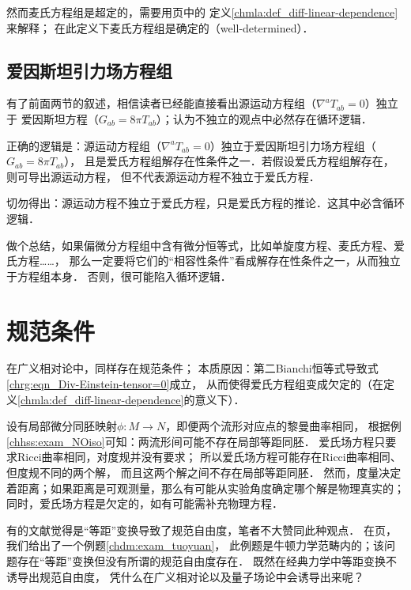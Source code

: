 然而麦氏方程组是超定的，需要用\pageref{chmla:def_diff-linear-dependence}页中的
定义\ref{chmla:def_diff-linear-dependence}来解释；
在此定义下麦氏方程组是确定的（well-determined）．

\subsection{爱因斯坦引力场方程组}
有了前面两节的叙述，相信读者已经能直接看出源运动方程组（$\nabla^a T_{ab}=0$）独立于
爱因斯坦方程（$G_{ab}=8\pi T_{ab}$）；认为不独立的观点中必然存在循环逻辑．

正确的逻辑是：源运动方程组（$\nabla^a T_{ab}=0$）独立于爱因斯坦引力场方程组（$G_{ab}=8\pi T_{ab}$），
且是爱氏方程组解存在性条件之一．若假设爱氏方程组解存在，则可导出源运动方程，
但不代表源运动方程不独立于爱氏方程．

切勿得出：源运动方程不独立于爱氏方程，只是爱氏方程的推论．这其中必含循环逻辑．

做个总结，如果偏微分方程组中含有微分恒等式，比如单旋度方程、麦氏方程、爱氏方程……，
那么一定要将它们的“相容性条件”看成解存在性条件之一，从而独立于方程组本身．
否则，很可能陷入循环逻辑．




\section{规范条件}
在广义相对论中，同样存在规范条件；
本质原因：第二Bianchi恒等式导致式\eqref{chrg:eqn_Div-Einstein-tensor=0}成立，
从而使得爱氏方程组变成欠定的（在定义\ref{chmla:def_diff-linear-dependence}的意义下）．

设有局部微分同胚映射$\phi:M\to N$，即便两个流形对应点的黎曼曲率相同，
根据例\ref{chhss:exam_NOiso}可知：两流形间可能不存在局部等距同胚．
爱氏场方程只要求Ricci曲率相同，对度规并没有要求；
所以爱氏场方程可能存在Ricci曲率相同、但度规不同的两个解，
而且这两个解之间不存在局部等距同胚．
然而，度量决定着距离；如果距离是可观测量，那么有可能从实验角度确定哪个解是物理真实的；
同时，爱氏场方程是欠定的，如有可能需补充物理方程．


有的文献觉得是“等距”变换导致了规范自由度，笔者不大赞同此种观点．
在\pageref{chdm:exam_tuoyuan}页，我们给出了一个例题\ref{chdm:exam_tuoyuan}，
此例题是牛顿力学范畴内的；该问题存在“等距”变换但没有所谓的规范自由度存在．
既然在经典力学中等距变换不诱导出规范自由度，
凭什么在广义相对论以及量子场论中会诱导出来呢？



